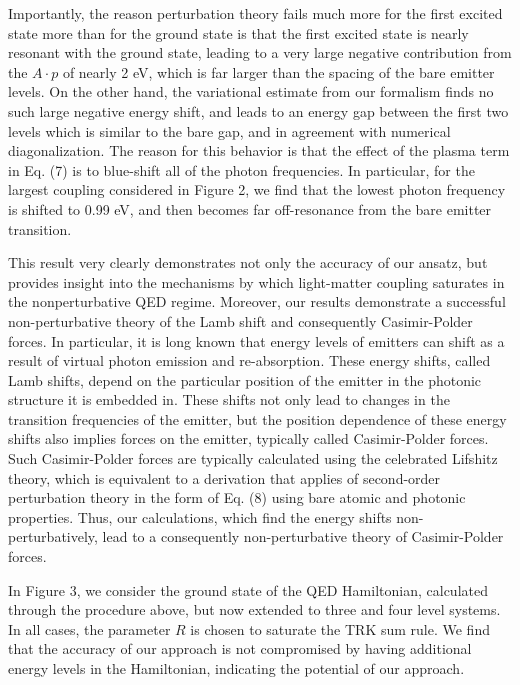 \documentclass[aps,prl,twocolumn,
	groupedaddress,superscriptaddress,
	amsfonts,amssymb,amsmath,floatfix,
	citeautoscript]{revtex4-1}
\begin{document}
Importantly, the reason perturbation theory fails much more for the first excited state more than for the ground state is that the first excited state is nearly resonant with the ground state, leading to a very large negative contribution from the $A\cdot p$ of nearly 2 eV, which is far larger than the spacing of the bare emitter levels. On the other hand, the variational estimate from our formalism finds no such large negative energy shift, and leads to an energy gap between the first two levels which is similar to the bare gap, and in agreement with numerical diagonalization. The reason for this behavior is that the effect of the plasma term in Eq. (7) is to blue-shift all of the photon frequencies. In particular, for the largest coupling considered in Figure 2, we find that the lowest photon frequency is shifted to 0.99 eV, and then becomes far off-resonance from the bare emitter transition. 

This result very clearly demonstrates not only the accuracy of our ansatz, but provides insight into the mechanisms by which light-matter coupling saturates in the nonperturbative QED regime. Moreover, our results demonstrate a successful non-perturbative theory of the Lamb shift and consequently Casimir-Polder forces. In particular, it is long known that energy levels of emitters can shift as a result of virtual photon emission and re-absorption. These energy shifts, called Lamb shifts, depend on the particular position of the emitter in the photonic structure it is embedded in. These shifts not only lead to changes in the transition frequencies of the emitter, but the position dependence of these energy shifts also implies forces on the emitter, typically called Casimir-Polder forces. Such Casimir-Polder forces are typically calculated using the celebrated Lifshitz theory, which is equivalent to a derivation that applies of second-order perturbation theory in the form of Eq. (8) using bare atomic and photonic properties. Thus, our calculations, which find the energy shifts non-perturbatively, lead to a consequently non-perturbative theory of Casimir-Polder forces. 

In Figure 3, we consider the ground state of the QED Hamiltonian, calculated through the procedure above, but now extended to three and four level systems. In all cases, the parameter $R$ is chosen to saturate the TRK sum rule. We find that the accuracy of our approach is not compromised by having additional energy levels in the Hamiltonian, indicating the potential of our approach.
\end{document}
